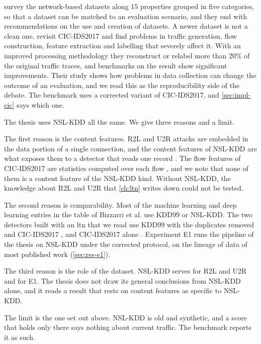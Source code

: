 \citet{ring2019survey} survey the network-based datasets along 15 properties
grouped in five categories, so that a dataset can be matched to an evaluation
scenario, and they end with recommendations on the use and creation of
datasets. A newer dataset is not a clean one. \citet{engelen2021troubleshooting}
revisit CIC-IDS2017 and find problems in traffic generation, flow construction,
feature extraction and labelling that severely affect it. With an improved
processing methodology they reconstruct or relabel more than 20\% of the
original traffic traces, and benchmarks on the result show significant
improvements. Their study shows how problems in data collection can
change the outcome of an evaluation, and we read this as the reproducibility
side of the debate. The benchmark uses a corrected variant of CIC-IDS2017, and
\cref{sec:impl-cic} says which one.

The thesis uses NSL-KDD all the same. We give three reasons and a limit.

The first reason is the content features. R2L and U2R attacks are embedded in
the data portion of a single connection, and the content features of NSL-KDD
are what exposes them to a detector that reads one record
\citep{tavallaee2009kddcup99}. The flow features of CIC-IDS2017 are statistics
computed over each flow \citep{sharafaldin2018cicids2017}, and we note that none
of them is a content feature of the NSL-KDD kind.
Without NSL-KDD, the knowledge about R2L and U2R that \cref{ch:ltn} writes down
could not be tested.

The second reason is comparability. Most of the machine learning and deep
learning entries in the table of Bizzarri et al. use KDD99 or NSL-KDD. The two
detectors built with an \gls{ltn} that we read use KDD99 with the duplicates
removed and CIC-IDS2017 \citep{onchis2022neurosymbolic}, and CIC-IDS2017 alone
\citep{bizzarri2024nsaids}. Experiment E1 runs the pipeline of the thesis on
NSL-KDD under the corrected protocol, on the lineage of data of most published work
(\cref{sec:res-e1}).

The third reason is the role of the dataset. NSL-KDD serves for R2L and U2R and
for E1. The thesis does not draw its general conclusions from
NSL-KDD alone, and it reads a result that rests on content features as specific
to NSL-KDD.

The limit is the one set out above. NSL-KDD is old and synthetic, and a score
that holds only there says nothing about current traffic. The benchmark reports
it as such.

